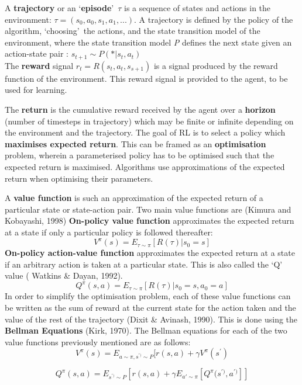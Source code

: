 A \textbf{trajectory} or an \lq \textbf{episode}\rq \ $\tau$ is a sequence of states and actions in the environment:
$\tau = (s_{0},a_{0},s_{1},a_{1},...) $.
A trajectory is defined by the policy of the algorithm, \lq choosing\rq \ the actions, and the state transition model of the environment, where the state transition model \textit{P} defines the next state given an action-state pair :
$s_{t+1} \sim P(*|s_{t},a_{t})$\\

The \textbf{reward} signal $r_{t} = R(s_{t},a_{t},s_{s+1})$ is a signal produced by the reward function of the environment. This reward signal is provided to the agent, to be used for learning. 

The \textbf{return} is the cumulative reward received by the agent over a \textbf{horizon} (number of timesteps in trajectory) which may be finite or infinite depending on the environment and the trajectory. The goal of RL is to select a policy which \textbf{maximises expected return}. This can be framed as an \textbf{optimisation} problem, wherein a parameterised policy has to be optimised such that the expected return is maximised. Algorithms use approximations of the expected return when optimising their parameters. 

A \textbf{value function} is such an approximation of the expected return of a particular state or state-action pair. Two main value functions are (Kimura and Kobayashi, 1998)
\textbf{On-policy value function} approximates the expected return at a state if only a particular policy is followed thereafter: 
\[V^{\pi}(s) = E_{\tau \sim \pi}[R(\tau)|s_{0} = s] \]
\textbf{On-policy action-value function} approximates the expected return at a state if an arbitrary action is taken at a particular state. This is also called the ‘Q’ value ( Watkins \& Dayan, 1992). 
\[ Q^{\pi}(s,a) = E_{\tau \sim \pi}[R(\tau)|s_{0} = s,a_{0}=a] \]
In order to simplify the optimisation problem, each of these value functions can be written as the sum of reward at the current state for the action taken and the value of the rest of the trajectory (Dixit \& Avinash, 1990). This is done using the \textbf{Bellman Equations} (Kirk, 1970). The Bellman equations for each of the two value functions previously mentioned are as follows:
\[ V^{\pi}(s) = E_{a \sim \pi , s^{\prime)} \sim P}[r(s,a) + \gamma V^{\pi}(s^{\prime})\]

\[ Q^{\pi}(s,a) = E_{s^{\prime)} \sim P}[r(s,a) + \gamma E_{a\prime \sim \pi}[Q^{\pi}(s^{\prime)}, a^{\prime)}]] \]

